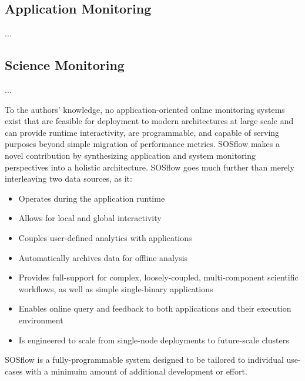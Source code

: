 \subsection{Application Monitoring}
%
...
%
\subsection{Science Monitoring}
%
...
%
\par
%
To the authors' knowledge, no application-oriented online monitoring systems
exist that are feasible for deployment to modern architectures at large scale
and can provide runtime interactivity, are programmable, and capable of
serving purposes beyond simple migration of performance metrics.
%
SOSflow makes a novel contribution by synthesizing application and system
monitoring perspectives into a holistic architecture.
%
SOSflow goes much further than merely interleaving two data sources, as it:
%
\begin{itemize}
    \item Operates during the application runtime
    \item Allows for local and global interactivity
    \item Couples user-defined analytics with applications
    \item Automatically archives data for offline analysis
    \item Provides full-support for complex, loosely-coupled,
        multi-component scientific workflows, as well as simple
        single-binary applications        
    \item Enables online query and feedback to both applications
        and their execution environment
    \item Is engineered to scale from single-node deployments
        to future-scale clusters
\end{itemize}
%
SOSflow is a fully-programmable system designed to be tailored to individual
use-cases with a minimuim amount of additional development or effort.
%
